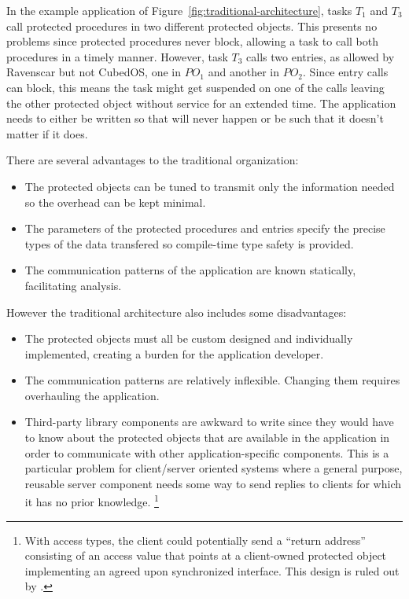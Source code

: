 In the example application of Figure~\ref{fig:traditional-architecture}, tasks $T_1$ and $T_3$
call protected procedures in two different protected objects. This presents no problems since
protected procedures never block, allowing a task to call both procedures in a timely manner.
However, task $T_3$ calls two entries, as allowed by Ravenscar but not CubedOS, one in $PO_1$
and another in $PO_2$. Since entry calls can block, this means the task might get suspended on
one of the calls leaving the other protected object without service for an extended time. The
application needs to either be written so that will never happen or be such that it doesn't
matter if it does.

There are several advantages to the traditional organization:

\begin{itemize}
\item The protected objects can be tuned to transmit only the information needed so the overhead
  can be kept minimal.
\item The parameters of the protected procedures and entries specify the precise types of the
  data transfered so compile-time type safety is provided.
\item The communication patterns of the application are known statically, facilitating analysis.
\end{itemize}

However the traditional architecture also includes some disadvantages:

\begin{itemize}
\item The protected objects must all be custom designed and individually implemented, creating a
  burden for the application developer.
\item The communication patterns are relatively inflexible. Changing them requires overhauling
  the application.
\item Third-party library components are awkward to write since they would have to know about
  the protected objects that are available in the application in order to communicate with other
  application-specific components. This is a particular problem for client/server oriented
  systems where a general purpose, reusable server component needs some way to send replies to
  clients for which it has no prior knowledge. \footnote{With access types, the client could
    potentially send a ``return address'' consisting of an access value that points at a
    client-owned protected object implementing an agreed upon synchronized interface. This design
    is ruled out by \SPARK.}
\end{itemize}

